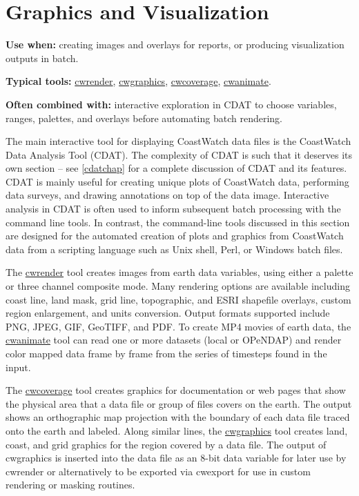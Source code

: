 \section{Graphics and Visualization}

\noindent\textbf{Use when:} creating images and overlays for reports, or producing visualization outputs in batch.\par
\noindent\textbf{Typical tools:} \hyperlink{cwrender}{cwrender}, \hyperlink{cwgraphics}{cwgraphics}, \hyperlink{cwcoverage}{cwcoverage}, \hyperlink{cwanimate}{cwanimate}.\par
\noindent\textbf{Often combined with:} interactive exploration in CDAT to choose variables, ranges, palettes, and overlays before automating batch rendering.\par

The main interactive tool for displaying CoastWatch data files is the
CoastWatch Data Analysis Tool (CDAT).  The complexity of CDAT is such
that it deserves its own section -- see \autoref{cdatchap} for a
complete discussion of CDAT and its features.  CDAT is mainly useful
for creating unique plots of CoastWatch data, performing data
surveys, and drawing annotations on top of the data image.  Interactive analysis 
in CDAT is often used to inform subsequent batch processing with the command 
line tools. In contrast, the command-line tools discussed in this section are designed
for the automated creation of plots and graphics from CoastWatch data
from a scripting language such as Unix shell, Perl, or Windows batch
files.

The \hyperlink{cwrender}{cwrender} tool creates images from earth data
variables, using either a palette or three channel composite mode.
Many rendering options are available including coast line, land mask,
grid line, topographic, and ESRI shapefile overlays, custom region
enlargement, and units conversion.  Output formats supported include
PNG, JPEG, GIF, GeoTIFF, and PDF.  To create MP4 movies of earth data, 
the \hyperlink{cwanimate}{cwanimate} tool 
can read one or more datasets (local or OPeNDAP) and render color mapped 
data frame by frame from the series of timesteps found in the input.

The \hyperlink{cwcoverage}{cwcoverage} tool creates
graphics for documentation or web pages that show the physical area
that a data file or group of files covers on the earth.  The output
shows an orthographic map projection with the boundary of each data
file traced onto the earth and labeled.  Along similar lines, the
\hyperlink{cwgraphics}{cwgraphics} tool creates land, coast, and grid 
graphics for the region covered by a data file.  The output of
cwgraphics is inserted into the data file as an 8-bit data variable
for later use by cwrender or alternatively to be exported via cwexport
for use in custom rendering or masking routines.

